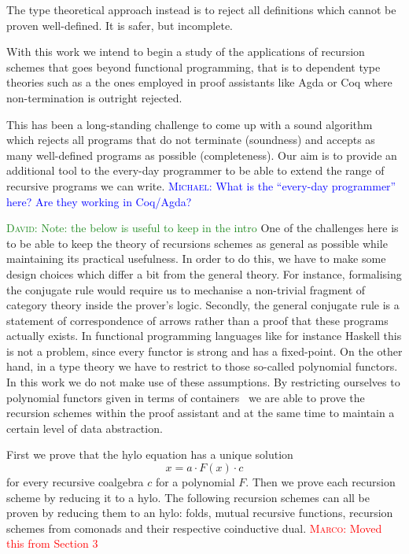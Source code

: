 \documentclass[anonymous, a4paper, UKenglish, cleveref, autoref, thm-restate]{lipics-v2021}
\newcommand{\mpav}[1]{\textcolor{red}{\textsc{Marco}: #1}}
\newcommand{\dcas}[1]{\textcolor{ForestGreen}{\textsc{David}: #1}}
\newcommand{\mvol}[1]{\textcolor{blue}{\textsc{Michael}: #1}}
\newcommand{\comp}{\cdot}
\begin{document}
The type theoretical approach instead is to reject all definitions which cannot
be proven well-defined. It is safer, but incomplete.

With this work we intend to begin a study of the applications of recursion
schemes that goes beyond functional programming, that is to dependent type
theories such as a the ones employed in proof assistants like Agda or Coq where
non-termination is outright rejected.

This has been a long-standing challenge to come up with a sound algorithm which
rejects all programs that do not terminate (soundness) and accepts as many
well-defined programs as possible (completeness). Our aim is to provide an
additional tool to the every-day programmer to be able to extend the range of
recursive programs we can write.
\mvol{What is the ``every-day programmer'' here? Are they working in Coq/Agda?}

\dcas{Note: the below is useful to keep in the intro}
One of the challenges here is to be able to keep the theory of recursions
schemes as general as possible while maintaining its practical usefulness. In
order to do this, we have to make some design choices which differ a bit from
the general theory.  For instance, formalising the conjugate rule would require
us to mechanise a non-trivial fragment of category theory inside the prover's
logic.  Secondly, the general conjugate rule is a statement of correspondence of
arrows rather than a proof that these programs actually exists. In functional
programming languages like for instance Haskell this is not a problem, since
every functor is strong and has a fixed-point.  On the other hand, in a type
theory we have to restrict to those so-called polynomial functors. In this work
we do not make use of these assumptions. By restricting ourselves to polynomial
functors given in terms of containers~\cite{AbbottAG05} we are able to prove the
recursion schemes within the proof assistant and at the same time to maintain a
certain level of data abstraction.

First we prove that the hylo equation has a unique solution
\[
  x = a \comp F(x) \comp c
\]
for every recursive coalgebra $c$ for a polynomial $F$. Then we prove each
recursion scheme by reducing it to a hylo. The following recursion schemes can
all be proven by reducing them to an hylo: folds, mutual recursive functions,
recursion schemes from comonads and their respective coinductive dual.
\mpav{Moved this from Section 3}
\end{document}
